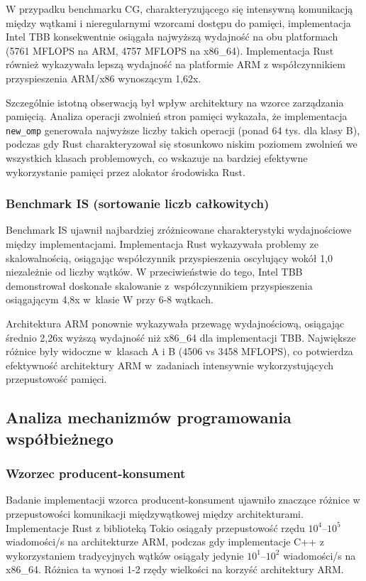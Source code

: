 W przypadku benchmarku CG, charakteryzującego się intensywną komunikacją między wątkami i nieregularnymi wzorcami dostępu do pamięci, implementacja Intel TBB konsekwentnie osiągała najwyższą wydajność na obu platformach (5761 MFLOPS na ARM, 4757 MFLOPS na x86\_64). Implementacja Rust również wykazywała lepszą wydajność na platformie ARM z współczynnikiem przyspieszenia ARM/x86 wynoszącym 1,62x.

Szczególnie istotną obserwacją był wpływ architektury na wzorce zarządzania pamięcią. Analiza operacji zwolnień stron pamięci wykazała, że implementacja \texttt{new\_omp} generowała najwyższe liczby takich operacji (ponad 64 tys. dla klasy B), podczas gdy Rust charakteryzował się stosunkowo niskim poziomem zwolnień we wszystkich klasach problemowych, co wskazuje na bardziej efektywne wykorzystanie pamięci przez alokator środowiska Rust.

\subsubsection{Benchmark IS (sortowanie liczb całkowitych)}

Benchmark IS ujawnił najbardziej zróżnicowane charakterystyki wydajnościowe między implementacjami. Implementacja Rust wykazywała problemy ze skalowalnością, osiągając współczynnik przyspieszenia oscylujący wokół 1,0 niezależnie od liczby wątków. W przeciwieństwie do tego, Intel TBB demonstrował doskonałe skalowanie z~współczynnikiem przyspieszenia osiągającym 4,8x w~klasie W przy 6-8 wątkach.

Architektura ARM ponownie wykazywała przewagę wydajnościową, osiągając średnio 2,26x wyższą wydajność niż x86\_64 dla implementacji TBB. Największe różnice były widoczne w~klasach A i B (4506 vs 3458 MFLOPS), co potwierdza efektywność architektury ARM w~zadaniach intensywnie wykorzystujących przepustowość pamięci.

\subsection{Analiza mechanizmów programowania współbieżnego}

\subsubsection{Wzorzec producent-konsument}

Badanie implementacji wzorca producent-konsument ujawniło znaczące różnice w przepustowości komunikacji międzywątkowej między architekturami. Implementacje Rust z biblioteką Tokio osiągały przepustowość rzędu $10^4$--$10^5$ wiadomości/s na architekturze ARM, podczas gdy implementacje C++ z wykorzystaniem tradycyjnych wątków osiągały jedynie $10^1$--$10^2$ wiadomości/s na x86\_64. Różnica ta wynosi 1-2 rzędy wielkości na korzyść architektury ARM.

